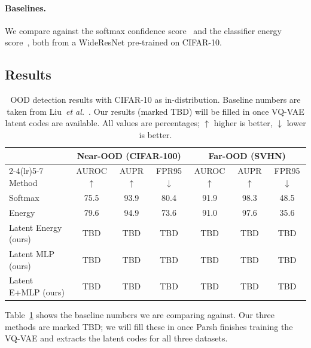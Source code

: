 \documentclass[10pt,twocolumn,letterpaper]{article}
\begin{document}
\paragraph{Baselines.}
We compare against the softmax confidence score~\cite{hendrycks2017baseline}
and the classifier energy score~\cite{liu2020energy}, both from a
WideResNet pre-trained on CIFAR-10.

\subsection{Results}

\begin{table}[t]
  \centering
  \caption{OOD detection results with CIFAR-10 as in-distribution.
           Baseline numbers are taken from Liu~\emph{et al.}~\cite{liu2020energy}.
           Our results (marked TBD) will be filled in once VQ-VAE latent
           codes are available. All values are percentages;
           $\uparrow$ higher is better, $\downarrow$ lower is better.}
  \label{tab:results}
  \small
  \setlength{\tabcolsep}{4pt}
  \begin{tabular}{lcccccc}
    \toprule
    & \multicolumn{3}{c}{Near-OOD (CIFAR-100)}
    & \multicolumn{3}{c}{Far-OOD (SVHN)} \\
    \cmidrule(lr){2-4}\cmidrule(lr){5-7}
    Method
      & \scriptsize AUROC$\uparrow$
      & \scriptsize AUPR$\uparrow$
      & \scriptsize FPR95$\downarrow$
      & \scriptsize AUROC$\uparrow$
      & \scriptsize AUPR$\uparrow$
      & \scriptsize FPR95$\downarrow$ \\
    \midrule
    Softmax~\cite{hendrycks2017baseline}
      & 75.5 & 93.9 & 80.4
      & 91.9 & 98.3 & 48.5 \\
    Energy~\cite{liu2020energy}
      & 79.6 & 94.9 & 73.6
      & 91.0 & 97.6 & 35.6 \\
    \midrule
    Latent Energy (ours)   & TBD & TBD & TBD & TBD & TBD & TBD \\
    Latent MLP (ours)      & TBD & TBD & TBD & TBD & TBD & TBD \\
    Latent E+MLP (ours)    & TBD & TBD & TBD & TBD & TBD & TBD \\
    \bottomrule
  \end{tabular}
\end{table}

Table~\ref{tab:results} shows the baseline numbers we are comparing
against. Our three methods are marked TBD; we will fill these in once
Parsh finishes training the VQ-VAE and extracts the latent codes for all
three datasets.
\end{document}
